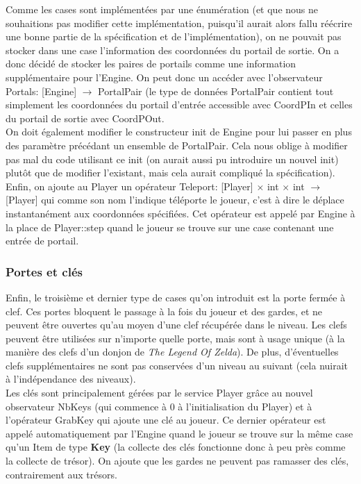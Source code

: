\documentclass{article}
\begin{document}
Comme les cases sont implémentées par une énumération (et que nous ne souhaitions pas modifier cette implémentation, puisqu'il aurait alors fallu réécrire une bonne partie de la spécification et de l'implémentation), on ne pouvait pas stocker dans une case l'information des coordonnées du portail de sortie. On a donc décidé de stocker les paires de portails comme une information supplémentaire pour l'\textrm{Engine}. On peut donc un accéder avec l'observateur \textrm{Portals: [Engine] $\rightarrow$ PortalPair} (le type de données \textrm{PortalPair} contient tout simplement les coordonnées du portail d'entrée accessible avec \textrm{CoordPIn} et celles du portail de sortie avec \textrm{CoordPOut}.\\
On doit également modifier le constructeur \textrm{init} de \textrm{Engine} pour lui passer en plus des paramètre précédant un ensemble de \textrm{PortalPair}. Cela nous oblige à modifier pas mal du code utilisant ce \textrm{init} (on aurait aussi pu introduire un nouvel \textrm{init}) plutôt que de modifier l'existant, mais cela aurait compliqué la spécification).\\
Enfin, on ajoute au \textrm{Player} un opérateur \textrm{Teleport: [Player] $\times$ int $\times$ int $\rightarrow$ [Player]} qui comme son nom l'indique téléporte le joueur, c'est à dire le déplace instantanément aux coordonnées spécifiées. Cet opérateur est appelé par \textrm{Engine} à la place de \textrm{Player::step} quand le joueur se trouve sur une case contenant une entrée de portail.

\subsubsection{Portes et clés}
Enfin, le troisième et dernier type de cases qu'on introduit est la porte fermée à clef. Ces portes bloquent le passage à la fois du joueur et des gardes, et ne peuvent être ouvertes qu'au moyen d'une clef récupérée dans le niveau. Les clefs peuvent être utilisées sur n'importe quelle porte, mais sont à usage unique (à la manière des clefs d'un donjon de \textit{The Legend Of Zelda}). De plus, d'éventuelles clefs supplémentaires ne sont pas conservées d'un niveau au suivant (cela nuirait à l'indépendance des niveaux).\\

Les clés sont principalement gérées par le service \textrm{Player} grâce au nouvel observateur \textrm{NbKeys} (qui commence à 0 à l'initialisation du \textrm{Player}) et à l'opérateur \textrm{GrabKey} qui ajoute une clé au joueur. Ce dernier opérateur est appelé automatiquement par l'\textrm{Engine} quand le joueur se trouve sur la même case qu'un \textrm{Item} de type \textbf{Key} (la collecte des clés fonctionne donc à peu près comme la collecte de trésor). On ajoute que les gardes ne peuvent pas ramasser des clés, contrairement aux trésors.\\
\end{document}
